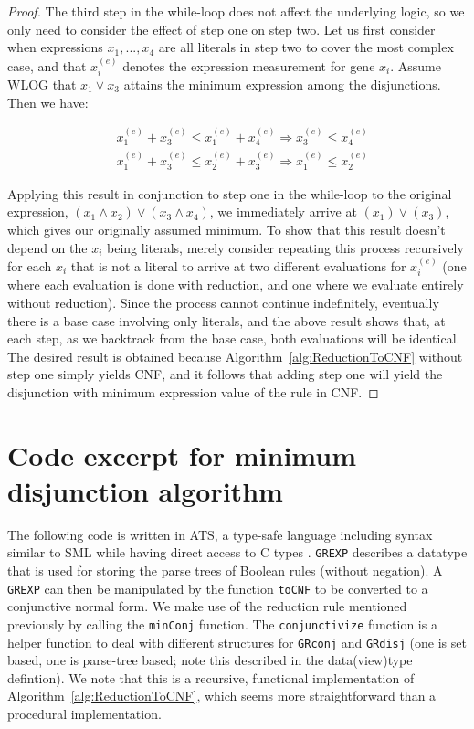\begin{proof}
The third step in the while-loop does not affect the
underlying logic, so we only need to consider the effect of step one
on step two.  Let us first consider when expressions $x_1, ..., x_4$
are all literals in step two to cover the most complex case, and that
$x_i^{(e)}$ denotes the expression measurement for gene $x_i$. Assume
WLOG that $x_1 \lor x_3$ attains the minimum expression among the
disjunctions. Then we have:

\begin{align*}
&x_{1}^{(e)} + x_{3}^{(e)} \leq x_{1}^{(e)} + x_{4}^{(e)} \Rightarrow x_{3}^{(e)} \leq x_{4}^{(e)} \\
&x_{1}^{(e)} + x_{3}^{(e)} \leq x_{2}^{(e)} + x_{3}^{(e)} \Rightarrow x_{1}^{(e)} \leq x_{2}^{(e)} 
\end{align*}

Applying this result in conjunction to step one in the while-loop to
the original expression, $(x_1 \land x_2) \lor (x_3 \land x_4)$, we
immediately arrive at $(x_1) \lor (x_3)$, which gives our originally
assumed minimum. To show that this result doesn't depend on the $x_i$
being literals, merely consider repeating this process recursively for
each $x_i$ that is not a literal to arrive at two different
evaluations for $x_i^{(e)}$ (one where each evaluation is done with
reduction, and one where we evaluate entirely without reduction).
Since the process cannot continue indefinitely, eventually there is a
base case involving only literals, and the above result shows that, at
each step, as we backtrack from the base case, both evaluations will
be identical. The desired result is obtained because
Algorithm~\ref{alg:ReductionToCNF} without step one simply yields CNF,
and it follows that adding step one will yield the disjunction with
minimum expression value of the rule in CNF.
\end{proof}

\section{Code excerpt for minimum disjunction algorithm}
\label{sec:code}

The following code is written in ATS, a type-safe language including
syntax similar to SML while having direct access to C types
\citep{ATStypes03}. \texttt{GREXP} describes a datatype that is used
for storing the parse trees of Boolean rules (without negation).  A
\texttt{GREXP} can then be manipulated by the function \texttt{toCNF}
to be converted to a conjunctive normal form. We make use of the
reduction rule mentioned previously by calling the \texttt{minConj}
function. The \texttt{conjunctivize} function is a helper function to
deal with different structures for \texttt{GRconj} and \texttt{GRdisj}
(one is set based, one is parse-tree based; note this described in the
data(view)type defintion). We note that this is a recursive,
functional implementation of Algorithm~\ref{alg:ReductionToCNF}, which
seems more straightforward than a procedural implementation.


